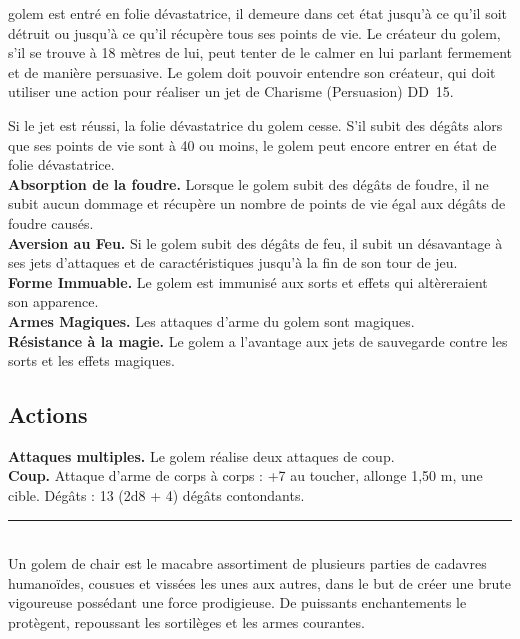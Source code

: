 \begin{figure*}[hbp]
{\begin{minipage}[c]{.45\linewidth}
               golem est entré en folie dévastatrice, il demeure dans cet état jusqu'à ce qu'il soit 
               détruit ou jusqu'à ce qu'il récupère tous ses points de vie. Le créateur du golem, s'il se 
               trouve à 18 mètres de lui, peut tenter de le calmer en lui parlant fermement et de manière 
               persuasive. Le golem doit pouvoir entendre son créateur, qui doit utiliser une action pour 
               réaliser un jet de Charisme (Persuasion) DD~15.
  \end{minipage}
  \hspace{4pt}
  \begin{minipage}[c]{.45\linewidth}
               Si le jet est réussi, la folie dévastatrice 
               du golem cesse. S'il subit des dégâts alors que ses points de vie sont à 40 ou moins, le 
               golem peut encore entrer en état de folie dévastatrice. \\
    {\bfseries Absorption de la foudre.} Lorsque le golem subit des dégâts de foudre, il ne subit aucun 
               dommage et récupère un nombre de points de vie égal aux dégâts de foudre causés. \\
    {\bfseries Aversion au Feu.} Si le golem subit des dégâts de feu, il subit un désavantage à ses jets 
               d'attaques et de caractéristiques jusqu'à la fin de son tour de jeu. \\
    {\bfseries Forme Immuable.} Le golem est immunisé aux sorts et effets qui altèreraient son apparence. \\
    {\bfseries Armes Magiques.} Les attaques d'arme du golem sont magiques. \\
    {\bfseries Résistance à la magie.} Le golem a l'avantage aux jets de sauvegarde contre les sorts et les 
               effets magiques.
    \subsection*{Actions}
    {\bfseries Attaques multiples.} Le golem réalise deux attaques de coup.\\
    {\bfseries Coup.} Attaque d'arme de corps à corps : +7 au toucher, allonge 1,50 m, une cible. 
               Dégâts : 13 (2d8 + 4) dégâts contondants. \\
    \noindent\rule{\textwidth}{1pt} \\
    Un golem de chair est le macabre assortiment de plusieurs parties de cadavres humanoïdes, cousues et 
    vissées les unes aux autres, dans le but de créer une brute vigoureuse possédant une force prodigieuse. 
    De puissants enchantements le protègent, repoussant les sortilèges et les armes courantes.
  \end{minipage}
}%
\end{figure*}

